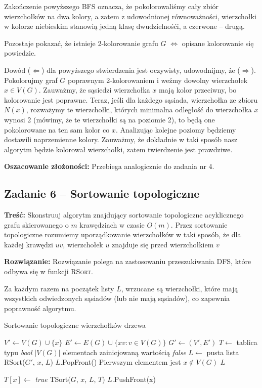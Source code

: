 Zakończenie powyższego BFS oznacza, że pokolorowaliśmy cały zbiór wierzchołków na
dwa kolory, a zatem z udowodnionej równoważności,
wierzchołki w kolorze niebieskim stanowią jedną klasę dwudzielnośći, a czerwone -- drugą.

Pozostaje pokazać, że istnieje 2-kolorowanie grafu $G$ $\Leftrightarrow$ opisane kolorowanie się powiedzie.

Dowód ($\Leftarrow$) dla powyższego stwierdzenia jest oczywisty, udowodnijmy, że ($\Rightarrow$). Pokolorujmy graf $G$
poprawnym 2-kolorowaniem i weźmy dowolny wierzchołek $x \in V(G)$. Zauważmy, że sąsiedzi
wierzchołka $x$ mają kolor przeciwny, bo kolorowanie jest poprawne. Teraz, jeśli dla każdego
sąsiada, wierzchołka ze zbioru $N(x)$, rozważymy te wierzchołki, których minimalna odległość do wierzchołka 
$x$ wynosi 2 (mówimy, że te wierzchołki są na poziomie 2), to będą one pokolorowane na ten sam 
kolor co $x$. Analizując kolejne poziomy
będziemy dostawili naprzemienne kolory. Zauważmy, że dokładnie w taki sposób nasz algorytm
będzie kolorował wierzchołki, zatem twierdzenie jest prawdziwe.

\textbf{Oszacowanie złożoności:} Przebiega analogicznie do zadania nr 4.

\subsection{Zadanie 6 -- Sortowanie topologiczne}
\textbf{Treść: } Skonstruuj algorytm znajdujący 
sortowanie topologiczne acyklicznego grafu skierowanego 
o $m$ krawędziach w czasie $O(m)$. 
Przez sortowanie topologiczne rozumiemy uporządkowanie 
wierzchołków w taki sposób, że dla
każdej krawędzi $uv$, wierzchołek $u$ znajduje się przed 
wierzchołkiem $v$

\textbf{Rozwiązanie:} Rozwiązanie polega na zastosowaniu przeszukiwania DFS, które
odbywa się w funkcji \textsc{RSort}.

Za każdym razem na początek listy $L$, wrzucane są wierzchołki, 
które mają wszystkich odwiedzonych sąsiadów (lub nie mają sąsiadów),
co zapewnia poprawność algorytmu.

\begin{algorithm}[H]
	\caption{Sortowanie topologiczne wierzchołków drzewa}
	\begin{algorithmic}[1]
		\State $V' \gets V(G) \cup \{x\}$
		\State $E' \gets E(G) \cup \{xv : v \in V(G)\}$
		\State $G' \gets (V', E')$
		\State $T \gets$ tablica typu \textit{bool} $|V(G)|$ elementach zainicjowaną wartością 
		\textit{false}
		\State $L \gets$ pusta lista
		\State RSort($G'$, $x$, $L$)
		\State $L$.PopFront() \Comment Pierwszym elementem jest $x \not \in V(G)$
		\State \Return $L$
		\EndProcedure
		
		\State $T[x] \gets$ \textit{true}
		\State TSort($G$, $x$, $L$, $T$)
		\EndIf
		\EndWhile
		\State $L$.PushFront(x)
		\EndProcedure
	\end{algorithmic}
	\label{alg:Zadanie26}
\end{algorithm}

